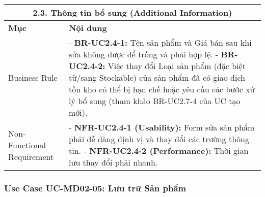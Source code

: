 \begin{longtable}{|m{4cm}|p{11cm}|}
\hline
\multicolumn{2}{|c|}{\textbf{2.3. Thông tin bổ sung (Additional Information)}} \\
\hline
\textbf{Mục} & \textbf{Nội dung} \\
\hline
Business Rule & - \textbf{BR-UC2.4-1:} Tên sản phẩm và Giá bán sau khi sửa không được để trống và phải hợp lệ. \newline - \textbf{BR-UC2.4-2:} Việc thay đổi Loại sản phẩm (đặc biệt từ/sang Stockable) của sản phẩm đã có giao dịch tồn kho có thể bị hạn chế hoặc yêu cầu các bước xử lý bổ sung (tham khảo BR-UC2.7-4 của UC tạo mới). \\
\hline
Non-Functional Requirement & - \textbf{NFR-UC2.4-1 (Usability):} Form sửa sản phẩm phải dễ dàng định vị và thay đổi các trường thông tin. \newline - \textbf{NFR-UC2.4-2 (Performance):} Thời gian lưu thay đổi phải nhanh. \\
\hline
\end{longtable}

\subsubsection{Use Case UC-MD02-05: Lưu trữ Sản phẩm}

